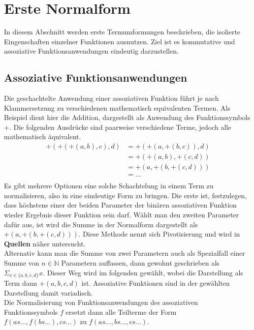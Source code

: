 \documentclass{article}
\begin{document}
\section {Erste Normalform}
In diesem Abschnitt werden erste Termumformungen beschrieben, die isolierte Eingenschaften einzelner Funktionen ausnutzen. Ziel ist es kommutative und assoziative Funktionsanwendungen eindeutig darzustellen.\\

\subsection {Assoziative Funktionsanwendungen}
Die geschachtelte Anwendung einer assoziativen Funktion führt je nach Klammersetzung zu verschiedenen mathematisch equivalenten Termen. Als Beispiel dient hier die Addition, dargestellt als Anwendung des Funktionssymbols $+$. Die folgenden Ausdrücke sind paarweise verschiedene Terme, jedoch alle mathematisch äquivalent.
\begin{equation*}
	\begin{split}
	+(+(+(a, b), c), d) &= +(+(a, +(b, c)), d)\\
	&= +(+(a, b), +(c, d))\\
	&= +(a, +(b, +(c, d)))\\
	&= \dots \\
	\end{split}
\end{equation*}
Es gibt mehrere Optionen eine solche Schachtelung in einem Term zu normalisieren, also in eine eindeutige Form zu bringen. Die erste ist, festzulegen, dass höchstens einer der beiden Parameter der binären assoziativen Funktion wieder Ergebnis dieser Funktion sein darf. Wählt man den zweiten Parameter dafür aus, ist wird die Summe in der Normalform dargestellt als $+(a, +(b, +(c, d)))$. Diese Methode nennt sich Pivotisierung und wird in \textbf{Quellen} näher untersucht.\\
Alternativ kann man die Summe von zwei Parametern auch als Spezialfall einer Summe von $n \in \mathbb{N}$ Parametern auffassen, dann gewohnt geschrieben als $\Sigma_{x \in \{a, b, c, d\}} x$. Dieser Weg wird im folgenden gewählt, wobei die Darstellung als Term dann $+(a, b, c, d)$ ist. Assoziative Funktionen sind in der gewählten Darstellung damit variadisch. \\
Die Normalisierung von Funktionsanwendungen des assoziativen Funktionssymbols $f$ ersetzt dann alle Teilterme der Form $f(as..., f(bs...), cs...)$ zu $f(as..., bs..., cs...)$.
\end{document}
